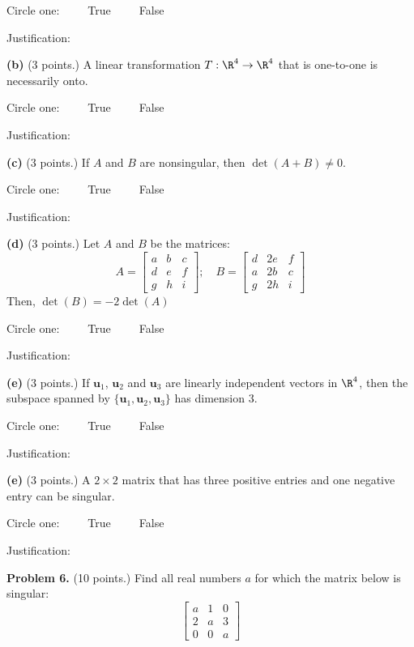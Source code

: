 \documentclass[12pt]{article}
\begin{document}
Circle one:\ \ \ \ \  True\ \ \ \ \ False

Justification:

\vskip1.5in


\textbf{(b)} (3 points.) A linear transformation $T:\R^4\to\R^4$ that is one-to-one is necessarily onto.

Circle one:\ \ \ \ \  True\ \ \ \ \ False

Justification:

\vskip1.5in


\textbf{(c)} (3 points.) If $A$ and $B$ are nonsingular, then $\det(A+B)\ne0$. 


Circle one:\ \ \ \ \  True\ \ \ \ \ False

Justification:

\clearpage

\textbf{(d)} (3 points.) Let $A$ and $B$ be the matrices:
\[
A=\begin{bmatrix}a&b&c\\d&e&f\\g&h&i\end{bmatrix};\quad
B=\begin{bmatrix}d&2e&f\\a&2b&c\\g&2h&i\end{bmatrix}
\]
Then, $\det(B)=-2\det(A)$

Circle one:\ \ \ \ \  True\ \ \ \ \ False

Justification:

\vskip1.5in


\textbf{(e)} (3 points.) If $\mathbf{u}_1$, $\mathbf{u}_2$ and $\mathbf{u}_3$ are linearly independent vectors in $\R^4$, then the subspace spanned by $\{\mathbf{u}_1,\mathbf{u}_2,\mathbf{u}_3\}$ has dimension 3.

Circle one:\ \ \ \ \  True\ \ \ \ \ False

Justification:

\vskip1.5in

\textbf{(e)} (3 points.) A $2\times 2$ matrix that has three positive entries and one negative entry can be singular.

Circle one:\ \ \ \ \  True\ \ \ \ \ False

Justification:

\clearpage

\textbf{Problem 6.} (10 points.) Find all real numbers $a$ for which the matrix below is singular:
\[
\left[\begin{matrix}a & 1 & 0\\2 & a & 3\\0 & 0 & a\end{matrix}\right]
\]
\end{document}
